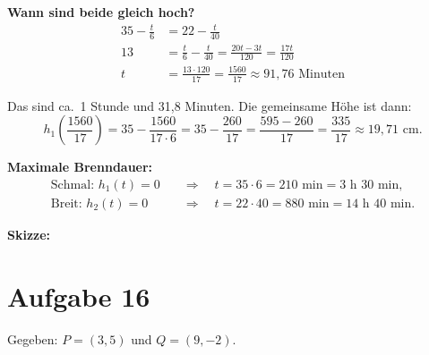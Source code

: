 \documentclass[12pt]{article}
\begin{document}
\textbf{Wann sind beide gleich hoch?}
\begin{align*}
  35 - \frac{t}{6} &= 22 - \frac{t}{40} \\
  13 &= \frac{t}{6} - \frac{t}{40} = \frac{20t - 3t}{120} = \frac{17t}{120} \\
  t &= \frac{13 \cdot 120}{17} = \frac{1560}{17} \approx 91{,}76 \text{ Minuten}
\end{align*}

Das sind ca.\ 1 Stunde und 31{,}8 Minuten. Die gemeinsame H\"ohe ist dann:
\[
  h_1\!\left(\frac{1560}{17}\right) = 35 - \frac{1560}{17 \cdot 6} = 35 - \frac{260}{17} = \frac{595 - 260}{17} = \frac{335}{17} \approx 19{,}71 \text{ cm}.
\]

\textbf{Maximale Brenndauer:}
\begin{align*}
  \text{Schmal: } h_1(t) = 0 &\quad\Longrightarrow\quad t = 35 \cdot 6 = 210 \text{ min} = 3 \text{ h } 30 \text{ min}, \\
  \text{Breit: } h_2(t) = 0 &\quad\Longrightarrow\quad t = 22 \cdot 40 = 880 \text{ min} = 14 \text{ h } 40 \text{ min}.
\end{align*}

\textbf{Skizze:}

\begin{center}
\end{center}


\section*{Aufgabe 16}

Gegeben: $P = (3, 5)$ und $Q = (9, -2)$.
\end{document}
